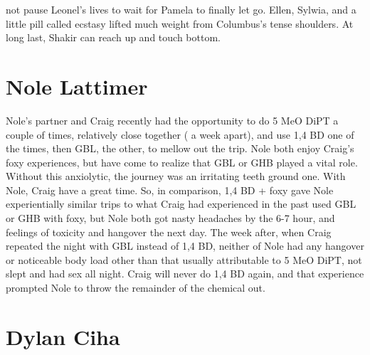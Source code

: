 \documentclass[12pt]{book}
\begin{document}
not pause Leonel's lives to wait for Pamela to finally let go. Ellen, Sylwia, and a little pill called ecstasy lifted much weight from Columbus's tense shoulders. At long last, Shakir can reach up and touch bottom.



\chapter{Nole Lattimer}

Nole's partner and Craig recently had the opportunity to do 5 MeO DiPT a couple of times, relatively close together ( a week apart), and use 1,4 BD one of the times, then GBL, the other, to mellow out the trip. Nole both enjoy Craig's foxy experiences, but have come to realize that GBL or GHB played a vital role. Without this anxiolytic, the journey was an irritating teeth ground one. With Nole, Craig have a great time. So, in comparison, 1,4 BD + foxy gave Nole experientially similar trips to what Craig had experienced in the past used GBL or GHB with foxy, but Nole both got nasty headaches by the 6-7 hour, and feelings of toxicity and hangover the next day. The week after, when Craig repeated the night with GBL instead of 1,4 BD, neither of Nole had any hangover or noticeable body load other than that usually attributable to 5 MeO DiPT, not slept and had sex all night. Craig will never do 1,4 BD again, and that experience prompted Nole to throw the remainder of the chemical out.






\chapter{Dylan Ciha}
\end{document}
